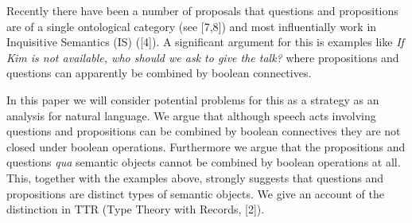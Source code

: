 \documentclass[a4wide]{article}
\newcommand{\ignore}[1]{}
\begin{document}

Recently there have been a number of proposals that questions and propositions are of
a single ontological category%
(see [7,8]\ignore{\cite{nelken-francez,nelken-shan06}}) and most influentially work
in Inquisitive Semantics (IS) ([4]\ignore{\cite{groenendijk09}}).  A significant
argument for this is examples like \textit{If Kim is not available,
  who should we ask to give the talk?} where propositions and
questions can apparently be combined by boolean connectives.

In this paper we will consider potential problems for this as a
strategy as an analysis for natural language. We argue that although
speech acts involving questions
and propositions can be combined by boolean connectives they are not closed under boolean operations.  Furthermore
we argue that the propositions and questions  \textit{qua} semantic
objects cannot
be combined by boolean operations at all. This, together with
the examples above, strongly suggests that questions and propositions are distinct
types of semantic objects. We give an account of
the distinction in TTR (Type Theory with Records,
[2]\ignore{\cite{cooper-ddl}}).

\end{document}
